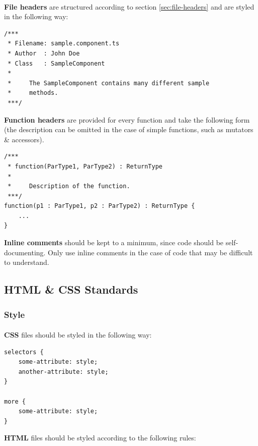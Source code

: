 \documentclass{article}
\begin{document}
    \paragraph{}
    \textbf{File headers} are structured according to section
    \ref{sec:file-headers} and are styled in the following way:

    \begin{lstlisting}
/***
 * Filename: sample.component.ts
 * Author  : John Doe
 * Class   : SampleComponent
 *
 *     The SampleComponent contains many different sample
 *     methods.
 ***/
    \end{lstlisting}

    \textbf{Function headers} are provided for every function and take the
    following form (the description can be omitted in the case of simple
    functions, such as mutators \& accessors).

    \begin{lstlisting}
/***
 * function(ParType1, ParType2) : ReturnType
 *
 *     Description of the function.
 ***/
function(p1 : ParType1, p2 : ParType2) : ReturnType {
    ...
}
    \end{lstlisting}

    \textbf{Inline comments} should be kept to a minimum, since code should be
    self-documenting. Only use inline comments in the case of code that may be
    difficult to understand.

    \subsection{HTML \& CSS Standards}
    \label{sec:html-css}

    \subsubsection{Style}
    \label{sec:ls-html-st}

    \paragraph{}
    \textbf{CSS} files should be styled in the following way:

    \begin{lstlisting}
selectors {
    some-attribute: style;
    another-attribute: style;
}

more {
    some-attribute: style;
}
    \end{lstlisting}

    \textbf{HTML} files should be styled according to the following rules:
\end{document}
